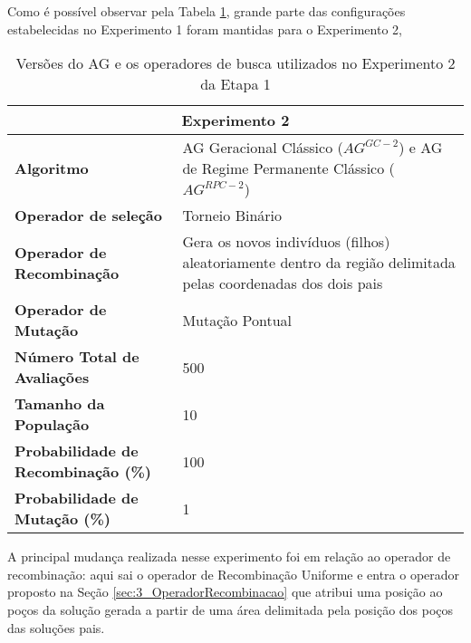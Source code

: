 Como é possível observar pela Tabela \ref{table:con02}, grande parte das configurações estabelecidas no Experimento 1 foram mantidas para o Experimento 2,

\begin{table}[!htbp]
\centering
\caption{Versões do AG e os operadores de busca utilizados no Experimento 2 da Etapa 1}
\label{table:con02}
\begin{tabular}{|p{6cm}|p{9cm}|}
\hline
\multicolumn{2}{|c|}{\textbf{Experimento 2}} \\ \hline
{\textbf{Algoritmo}} & AG Geracional Clássico ($AG^{GC-2}$) e AG de Regime Permanente Clássico ($AG^{RPC-2}$) \\ \hline
\textbf{Operador de seleção} & Torneio Binário \\ \hline
\textbf{Operador de Recombinação} & Gera os novos indivíduos (filhos) aleatoriamente dentro da região delimitada pelas coordenadas dos dois pais \\  \hline
\textbf{Operador de Mutação} & Mutação Pontual \\ \hline
\textbf{Número Total de Avaliações} & 500 \\ \hline
\textbf{Tamanho da População} & 10 \\ \hline
\textbf{Probabilidade de Recombinação (\%)} & 100 \\ \hline
\textbf{Probabilidade de Mutação (\%)} & 1 \\ \hline
\end{tabular}
\end{table}

A principal mudança realizada nesse experimento foi em relação ao operador de recombinação: aqui sai o operador de  Recombinação Uniforme e entra o operador proposto na Seção \ref{sec:3_OperadorRecombinacao} que atribui uma posição ao poços da solução gerada a partir de uma área delimitada pela posição dos poços das soluções pais.

